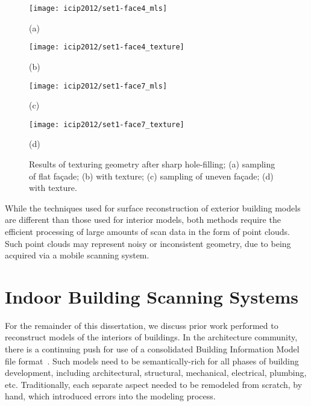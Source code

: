 \documentclass[12pt,onecolumn,oneside]{book}
\begin{document}
\begin{figure}[b]

\begin{minipage}[b]{.48\linewidth}
  \centering
  \centerline{\texttt{[image: icip2012/set1-face4\_mls]}}
  \centerline{(a)}\medskip
\end{minipage}
\hfill
\begin{minipage}[b]{.48\linewidth}
  \centering
  \centerline{\texttt{[image: icip2012/set1-face4\_texture]}}
  \centerline{(b)}\medskip
\end{minipage}
%
\begin{minipage}[b]{.48\linewidth}
  \centering
  \centerline{\texttt{[image: icip2012/set1-face7\_mls]}}
  \centerline{(c)}\medskip
\end{minipage}
\hfill
\begin{minipage}[b]{.48\linewidth}
  \centering
  \centerline{\texttt{[image: icip2012/set1-face7\_texture]}}
  \centerline{(d)}\medskip
\end{minipage}
\caption[Meshes of building fa\c{c}ades with texture.]{Results of texturing geometry after sharp hole-filling; (a) sampling of flat fa\c{c}ade; (b) with texture; (c) sampling of uneven fa\c{c}ade; (d) with texture.}
\label{fig:icip2012_texture}
\end{figure}

While the techniques used for surface reconstruction of exterior building models are different than those used for interior models, both methods require the efficient processing of large amounts of scan data in the form of point clouds.  Such point clouds may represent noisy or inconsistent geometry, due to being acquired via a mobile scanning system.

\FloatBarrier
\section{Indoor Building Scanning Systems}
\label{sec:indoor_scanning}

For the remainder of this dissertation, we discuss prior work performed to reconstruct models of the interiors of buildings.  In the architecture community, there is a continuing push for use of a consolidated Building Information Model file format~\cite{AutodeskBIM}.  Such models need to be semantically-rich for all phases of building development, including architectural, structural, mechanical, electrical, plumbing, etc.  Traditionally, each separate aspect needed to be remodeled from scratch, by hand, which introduced errors into the modeling process.
\end{document}
